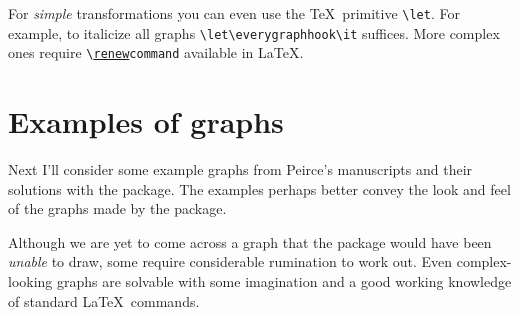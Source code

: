 \documentclass[a4paper,justified]{tufte-handout}
\begin{document}
For \textit{simple} transformations you can even use the \TeX\ primitive \verb|\let|. For example, to italicize all graphs \verb|\let\everygraphhook\it| suffices. More complex ones require \verb|\|\texttt{\uline{\uline{re}new}}\verb|command| available in \LaTeX .
\vfill


\section{\hspace*{-15pt}Examples of graphs}

Next I'll consider some example graphs from Peirce's manuscripts and their solutions with the package. The examples perhaps better convey the look and feel of the graphs made by the package.

Although we are yet to come across a graph that the package would have been \textit{unable} to draw, some require considerable rumination to work out. Even complex-looking graphs are solvable with some imagination and a good working knowledge of standard \LaTeX\ commands.
\newpage
\end{document}
